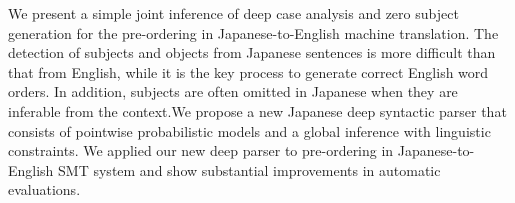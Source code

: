 We present a simple joint inference of deep case analysis and zero subject generation for the pre-ordering in Japanese-to-English machine translation. The detection of subjects and objects from Japanese sentences is more difficult than that from English, while it is the key process to generate correct English word orders. In addition, subjects are often omitted in Japanese when they are inferable from the context.We propose a new Japanese deep syntactic parser that consists of pointwise probabilistic models and a global inference with linguistic constraints. We applied our new deep parser to pre-ordering in Japanese-to-English SMT system and show substantial improvements in automatic evaluations.
